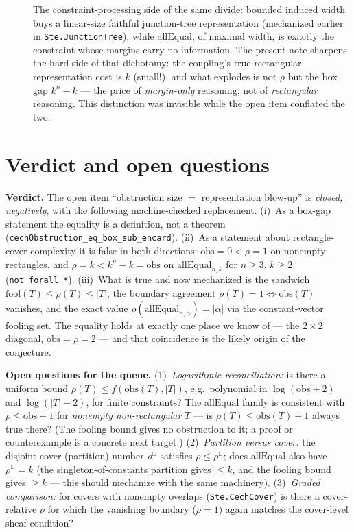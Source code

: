 \documentclass[11pt]{article}
\newcommand{\ste}[1]{\texttt{#1}}
\begin{document}
\begin{description}
\item[\citet{dechter2003constraint}]
The constraint-processing side of the same divide: bounded induced
width buys a linear-size faithful junction-tree representation
(mechanized earlier in \ste{Ste.JunctionTree}), while
$\mathrm{allEqual}$, of maximal width, is exactly the constraint whose
margins carry no information. The present note sharpens the hard side
of that dichotomy: the coupling's true rectangular representation cost
is $k$ (small!), and what explodes is not $\rho$ but the box gap
$k^n-k$ --- the price of \emph{margin-only} reasoning, not of
\emph{rectangular} reasoning. This distinction was invisible while the
open item conflated the two.

\end{description}

\section{Verdict and open questions}

\textbf{Verdict.} The open item ``obstruction size $=$ representation
blow-up'' is \emph{closed, negatively}, with the following
machine-checked replacement. (i)~As a box-gap statement the equality is
a definition, not a theorem
(\ste{cechObstruction\_eq\_box\_sub\_encard}). (ii)~As a statement
about rectangle-cover complexity it is false in both directions:
$\mathrm{obs}=0<\rho=1$ on nonempty rectangles, and
$\rho=k<k^n-k=\mathrm{obs}$ on $\mathrm{allEqual}_{n,k}$ for $n\ge3$,
$k\ge2$
(\ste{not\_forall\_*}). (iii)~What is true and now mechanized is the
sandwich $\mathrm{fool}(T)\le\rho(T)\le|T|$, the boundary agreement
$\rho(T)=1\Leftrightarrow\mathrm{obs}(T)$ vanishes, and the exact value
$\rho(\mathrm{allEqual}_{n,\alpha})=|\alpha|$ via the constant-vector
fooling set. The equality holds at exactly one place we know of ---
the $2\times2$ diagonal, $\mathrm{obs}=\rho=2$ --- and that coincidence
is the likely origin of the conjecture.

\textbf{Open questions for the queue.}
(1)~\emph{Logarithmic reconciliation:} is there a uniform bound
$\rho(T)\le f(\mathrm{obs}(T),|T|)$, e.g.\ polynomial in
$\log(\mathrm{obs}+2)$ and $\log(|T|+2)$, for finite constraints? The
$\mathrm{allEqual}$ family is consistent with
$\rho\le\mathrm{obs}+1$ for \emph{nonempty non-rectangular} $T$
--- is $\rho(T)\le\mathrm{obs}(T)+1$ always true there? (The fooling
bound gives no obstruction to it; a proof or counterexample is a
concrete next target.)
(2)~\emph{Partition versus cover:} the disjoint-cover (partition)
number $\rho^{\sqcup}$ satisfies
$\rho\le\rho^{\sqcup}$; does $\mathrm{allEqual}$ also have
$\rho^{\sqcup}=k$ (the singleton-of-constants partition gives
$\le k$, and the fooling bound gives $\ge k$ --- this should mechanize
with the same machinery).
(3)~\emph{Graded comparison:} for covers with nonempty overlaps
(\ste{Ste.CechCover}) is there a cover-relative $\rho$ for which the
vanishing boundary ($\rho=1$) again matches the cover-level sheaf
condition?



\end{document}

